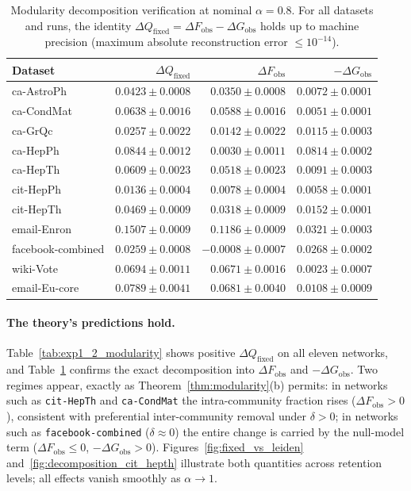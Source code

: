 \begin{table}[t]
\centering
\caption{Modularity decomposition verification at nominal $\alpha = 0.8$.
For all datasets and runs, the identity $\Delta Q_{\mathrm{fixed}} = \Delta F_{\mathrm{obs}} - \Delta G_{\mathrm{obs}}$ holds up to machine precision (maximum absolute reconstruction error $\le 10^{-14}$).}
\label{tab:exp1_2_decomposition}
\begin{tabular}{lrrr}
\toprule
Dataset & $\Delta Q_{\mathrm{fixed}}$ & $\Delta F_{\mathrm{obs}}$ & $-\Delta G_{\mathrm{obs}}$  \\
\midrule
ca-AstroPh & $0.0423 \pm 0.0008$ & $0.0350 \pm 0.0008$ & $0.0072 \pm 0.0001$  \\
ca-CondMat & $0.0638 \pm 0.0016$ & $0.0588 \pm 0.0016$ & $0.0051 \pm 0.0001$ \\
ca-GrQc & $0.0257 \pm 0.0022$ & $0.0142 \pm 0.0022$ & $0.0115 \pm 0.0003$ \\
ca-HepPh & $0.0844 \pm 0.0012$ & $0.0030 \pm 0.0011$ & $0.0814 \pm 0.0002$ \\
ca-HepTh & $0.0609 \pm 0.0023$ & $0.0518 \pm 0.0023$ & $0.0091 \pm 0.0003$  \\
cit-HepPh & $0.0136 \pm 0.0004$ & $0.0078 \pm 0.0004$ & $0.0058 \pm 0.0001$ \\
cit-HepTh & $0.0469 \pm 0.0009$ & $0.0318 \pm 0.0009$ & $0.0152 \pm 0.0001$  \\
email-Enron & $0.1507 \pm 0.0009$ & $0.1186 \pm 0.0009$ & $0.0321 \pm 0.0003$  \\
facebook-combined & $0.0259 \pm 0.0008$ & $-0.0008 \pm 0.0007$ & $0.0268 \pm 0.0002$  \\
wiki-Vote & $0.0694 \pm 0.0011$ & $0.0671 \pm 0.0016$ & $0.0023 \pm 0.0007$  \\
email-Eu-core & $0.0789 \pm 0.0041$ & $0.0681 \pm 0.0040$ & $0.0108 \pm 0.0009$ \\
\bottomrule
\end{tabular}
\end{table}

\paragraph{The theory's predictions hold.}
Table~\ref{tab:exp1_2_modularity} shows positive $\Delta Q_{\mathrm{fixed}}$ on all eleven networks, and Table~\ref{tab:exp1_2_decomposition} confirms the exact decomposition into $\Delta F_{\mathrm{obs}}$ and $-\Delta G_{\mathrm{obs}}$.
Two regimes appear, exactly as Theorem~\ref{thm:modularity}(b) permits: in networks such as \texttt{cit-HepTh} and \texttt{ca-CondMat} the intra-community fraction rises ($\Delta F_{\mathrm{obs}} > 0$), consistent with preferential inter-community removal under $\delta > 0$; in networks such as \texttt{facebook-combined} ($\delta \approx 0$) the entire change is carried by the null-model term ($\Delta F_{\mathrm{obs}} \le 0$, $-\Delta G_{\mathrm{obs}} > 0$).
Figures~\ref{fig:fixed_vs_leiden} and~\ref{fig:decomposition_cit_hepth} illustrate both quantities across retention levels; all effects vanish smoothly as $\alpha \to 1$.

